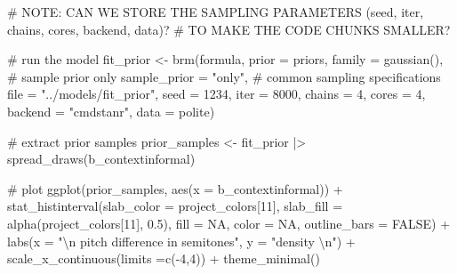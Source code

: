 \documentclass[
  doc,
  longtable,
  nolmodern,
  notxfonts,
  notimes,
  colorlinks=true,linkcolor=blue,citecolor=blue,urlcolor=blue]{apa7}
\newenvironment{Shaded}{\begin{snugshade}}{\end{snugshade}}
\newcommand{\AlertTok}[1]{\textcolor[rgb]{0.68,0.00,0.00}{#1}}
\newcommand{\AttributeTok}[1]{\textcolor[rgb]{0.40,0.45,0.13}{#1}}
\newcommand{\CommentTok}[1]{\textcolor[rgb]{0.37,0.37,0.37}{#1}}
\newcommand{\ConstantTok}[1]{\textcolor[rgb]{0.56,0.35,0.01}{#1}}
\newcommand{\DecValTok}[1]{\textcolor[rgb]{0.68,0.00,0.00}{#1}}
\newcommand{\FloatTok}[1]{\textcolor[rgb]{0.68,0.00,0.00}{#1}}
\newcommand{\FunctionTok}[1]{\textcolor[rgb]{0.28,0.35,0.67}{#1}}
\newcommand{\NormalTok}[1]{\textcolor[rgb]{0.00,0.23,0.31}{#1}}
\newcommand{\OtherTok}[1]{\textcolor[rgb]{0.00,0.23,0.31}{#1}}
\newcommand{\SpecialCharTok}[1]{\textcolor[rgb]{0.37,0.37,0.37}{#1}}
\newcommand{\StringTok}[1]{\textcolor[rgb]{0.13,0.47,0.30}{#1}}
\begin{document}
\begin{Shaded}
\begin{Highlighting}[]
\CommentTok{\# }\AlertTok{NOTE}\CommentTok{: CAN WE STORE THE SAMPLING PARAMETERS (seed, iter, chains, cores, backend, data)? }
\CommentTok{\#       TO MAKE THE CODE CHUNKS SMALLER?}

\CommentTok{\# run the model}
\NormalTok{fit\_prior }\OtherTok{\textless{}{-}} \FunctionTok{brm}\NormalTok{(formula,}
           \AttributeTok{prior =}\NormalTok{ priors,}
           \AttributeTok{family =} \FunctionTok{gaussian}\NormalTok{(),}
           \CommentTok{\# sample prior only}
           \AttributeTok{sample\_prior =} \StringTok{"only"}\NormalTok{,}
           \CommentTok{\# common sampling specifications}
           \AttributeTok{file  =} \StringTok{"../models/fit\_prior"}\NormalTok{,}
           \AttributeTok{seed =} \DecValTok{1234}\NormalTok{,}
           \AttributeTok{iter =} \DecValTok{8000}\NormalTok{,}
           \AttributeTok{chains =} \DecValTok{4}\NormalTok{,}
           \AttributeTok{cores =} \DecValTok{4}\NormalTok{,}
           \AttributeTok{backend =} \StringTok{"cmdstanr"}\NormalTok{,}
           \AttributeTok{data =}\NormalTok{ polite)}
\end{Highlighting}
\end{Shaded}

\begin{Shaded}
\begin{Highlighting}[]
\CommentTok{\# extract prior samples}
\NormalTok{prior\_samples }\OtherTok{\textless{}{-}} 
\NormalTok{  fit\_prior }\SpecialCharTok{|\textgreater{}} 
  \FunctionTok{spread\_draws}\NormalTok{(b\_contextinformal)}
  
\CommentTok{\# plot  }
\FunctionTok{ggplot}\NormalTok{(prior\_samples,}
       \FunctionTok{aes}\NormalTok{(}\AttributeTok{x =}\NormalTok{ b\_contextinformal)) }\SpecialCharTok{+} 
  \FunctionTok{stat\_histinterval}\NormalTok{(}\AttributeTok{slab\_color =}\NormalTok{ project\_colors[}\DecValTok{11}\NormalTok{],}
                    \AttributeTok{slab\_fill =} \FunctionTok{alpha}\NormalTok{(project\_colors[}\DecValTok{11}\NormalTok{], }\FloatTok{0.5}\NormalTok{),}
                    \AttributeTok{fill =} \ConstantTok{NA}\NormalTok{,}
                    \AttributeTok{color =} \ConstantTok{NA}\NormalTok{,}
                    \AttributeTok{outline\_bars =} \ConstantTok{FALSE}\NormalTok{) }\SpecialCharTok{+}
  \FunctionTok{labs}\NormalTok{(}\AttributeTok{x =} \StringTok{"}\SpecialCharTok{\textbackslash{}n}\StringTok{ pitch difference in semitones"}\NormalTok{,}
       \AttributeTok{y =} \StringTok{"density }\SpecialCharTok{\textbackslash{}n}\StringTok{"}\NormalTok{) }\SpecialCharTok{+}
  \FunctionTok{scale\_x\_continuous}\NormalTok{(}\AttributeTok{limits =}\FunctionTok{c}\NormalTok{(}\SpecialCharTok{{-}}\DecValTok{4}\NormalTok{,}\DecValTok{4}\NormalTok{)) }\SpecialCharTok{+}
  \FunctionTok{theme\_minimal}\NormalTok{() }
\end{Highlighting}
\end{Shaded}
\end{document}
